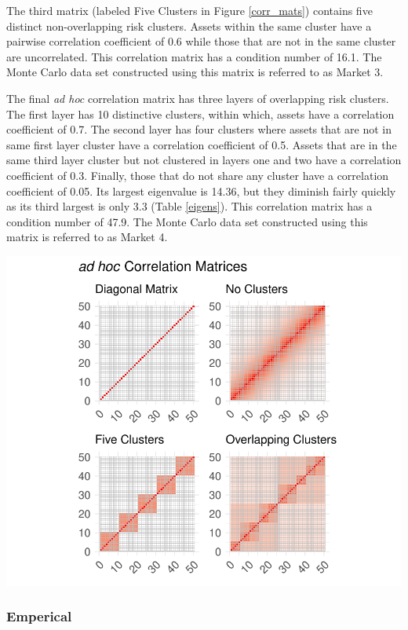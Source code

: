 \documentclass[11pt,preprint, authoryear]{elsarticle}
\let\origfigure\figure
\let\endorigfigure\endfigure
\renewenvironment{figure}[1][2] {
    \expandafter\origfigure\expandafter[H]
} {
    \endorigfigure
}
\numberwithin{equation}{section}
\numberwithin{figure}{section}
\numberwithin{table}{section}
\begin{document}
The third matrix (labeled Five Clusters in Figure \ref{corr_mats})
contains five distinct non-overlapping risk clusters. Assets within the
same cluster have a pairwise correlation coefficient of 0.6 while those
that are not in the same cluster are uncorrelated. This correlation
matrix has a condition number of 16.1. The Monte Carlo data set
constructed using this matrix is referred to as Market 3.

The final \emph{ad hoc} correlation matrix has three layers of
overlapping risk clusters. The first layer has 10 distinctive clusters,
within which, assets have a correlation coefficient of 0.7. The second
layer has four clusters where assets that are not in same first layer
cluster have a correlation coefficient of 0.5. Assets that are in the
same third layer cluster but not clustered in layers one and two have a
correlation coefficient of 0.3. Finally, those that do not share any
cluster have a correlation coefficient of 0.05. Its largest eigenvalue
is 14.36, but they diminish fairly quickly as its third largest is only
3.3 (Table \ref{eigens}). This correlation matrix has a condition number
of 47.9. The Monte Carlo data set constructed using this matrix is
referred to as Market 4.

\begin{figure}
\centering
\includegraphics{Thesis_files/figure-latex/corr mats-1.pdf}
\caption{\label{corr_mats} Correlation Matrices}
\end{figure}

\hypertarget{emperical}{%
\subsubsection{\texorpdfstring{Emperical
\label{emp}}{Emperical }}\label{emperical}}
\end{document}
